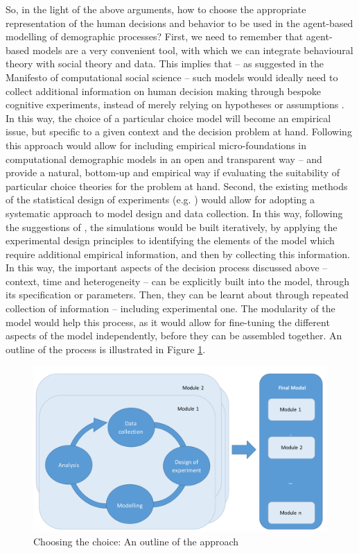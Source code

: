 \documentclass{article}
\begin{document}
So, in the light of the above arguments, how to choose the appropriate representation of the human decisions and behavior to be used in the agent-based modelling of demographic processes? 
First, we need to remember that agent-based models are a very convenient tool, with which we can integrate behavioural theory with social theory and data. This implies that – as suggested in the Manifesto of computational social science \citep{Conte} – such models would ideally need to collect additional information on human decision making through bespoke cognitive experiments, instead of merely relying on hypotheses or assumptions \citep{Courgeau}. In this way, the choice of a particular choice model will become an empirical issue, but specific to a given context and the decision problem at hand. Following this approach would allow for including empirical micro-foundations in computational demographic models in an open and transparent way – and provide a natural, bottom-up and empirical way if evaluating the suitability of particular choice theories for the problem at hand.
Second, the existing methods of the statistical design of experiments (e.g. \citeauthor{Chaloner} \citeyear{Chaloner}) would allow for adopting a systematic approach to model design and data collection. In this way, following the suggestions of \citet{Courgeau}, the simulations would be built iteratively, by applying the experimental design principles to identifying the elements of the model which require additional empirical information, and then by collecting this information.  In this way, the important aspects of the decision process discussed above – context, time and heterogeneity – can be explicitly built into the model, through its specification or parameters. Then, they can be learnt about through repeated collection of information – including experimental one. The modularity of the model would help this process, as it would allow for fine-tuning the different aspects of the model independently, before they can be assembled together. An outline of the process is illustrated in Figure \ref{fig:approach}.

\begin{figure}
\includegraphics[width=\textwidth]{process}
\caption{Choosing the choice: An outline of the approach \label{fig:approach}}
\end{figure}
\end{document}
